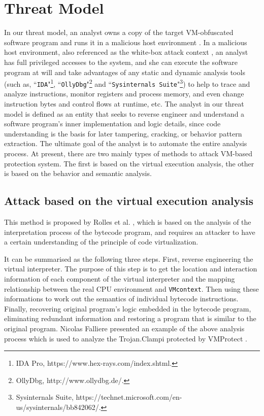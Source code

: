 \section{Threat Model}\label{sec:threat-model}
In our threat model, an analyst owns a copy of the target VM-obfuscated software program and runs it in a malicious host environment \cite{collberg2002watermarking}. In a malicious host environment, also referenced as the white-box attack context \cite{chow2003white,liem2008compiler}, an analyst has full privileged accesses to the system, and she can execute the software program at will and take advantages of any static and dynamic analysis tools (such as, ``\texttt{IDA}"\footnote{IDA Pro, https://www.hex-rays.com/index.shtml.}, ``\texttt{OllyDbg}"\footnote{OllyDbg, http://www.ollydbg.de/.} and ``\texttt{Sysinternals Suite}"\footnote{Sysinternals Suite, https://technet.microsoft.com/en-us/sysinternals/bb842062/.}) to help to trace and analyze instructions, monitor registers and process memory, and even change instruction bytes and control flows at runtime, etc. The analyst in our threat model is defined as an entity that seeks to reverse engineer and understand a software program's inner implementation and logic details, since code understanding is the basis for later tampering, cracking, or behavior pattern extraction. The ultimate goal of the analyst is to automate the entire analysis process. At present, there are two mainly types of methods to attack VM-based protection system. The first is based on the virtual execution analysis, the other is based on the behavior and semantic analysis.

\subsection{Attack based on the virtual execution analysis}
This method is proposed by Rolles et al. \cite{rolles2009unpacking}, which is based on the analysis of the interpretation process of the bytecode program, and requires an attacker to have a certain understanding of the principle of code virtualization.

It can be summarised as the following three steps. First, reverse engineering the virtual interpreter. The purpose of this step is to get the location and interaction information of each component of the virtual interpreter and the mapping relationship between the real CPU environment and \texttt{VMcontext}. Then using these informations to work out the semantics of individual bytecode instructions. %
Finally, recovering original program's logic embedded in the bytecode program, eliminating redundant information and restoring a program that is similar to the original program. Nicolas Falliere \cite{falliere2009inside} presented an example of the above analysis process which is used to analyze the Trojan.Clampi protected by VMProtect \cite{vmp}.

